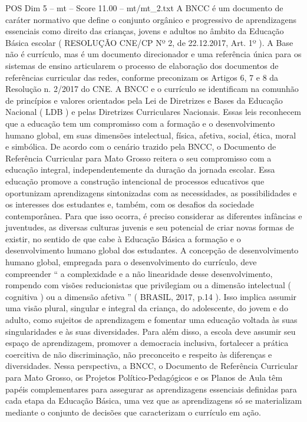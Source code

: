 \begin{textsample}{POS Dim 5 – mt – Score 11.00 – mt/mt\_2.txt}
A BNCC é um documento de caráter normativo que define o conjunto orgânico e progressivo de aprendizagens essenciais como direito das crianças, jovens e adultos no âmbito da Educação Básica escolar ( RESOLUÇÃO CNE/CP Nº 2, de 22.12.2017, Art. 1º ).
A Base não é currículo, mas é um documento direcionador e uma referência única para os sistemas de ensino articularem o processo de elaboração dos documentos de referências curricular das redes, conforme preconizam os Artigos 6, 7 e 8 da Resolução n. 2/2017 do CNE.
A BNCC e o currículo se identificam na comunhão de princípios e valores orientados pela Lei de Diretrizes e Bases da Educação Nacional ( LDB ) e pelas Diretrizes Curriculares Nacionais.
Essas leis reconhecem que a educação tem um compromisso com a formação e o desenvolvimento humano global, em suas dimensões intelectual, física, afetiva, social, ética, moral e simbólica.
De acordo com o cenário trazido pela BNCC, o Documento de Referência Curricular para Mato Grosso reitera o seu compromisso com a educação integral, independentemente da duração da jornada escolar.
Essa educação promove a construção intencional de processos educativos que oportunizam aprendizagens sintonizadas com as necessidades, as possibilidades e os interesses dos estudantes e, também, com os desafios da sociedade contemporânea.
Para que isso ocorra, é preciso considerar as diferentes infâncias e juventudes, as diversas culturas juvenis e seu potencial de criar novas formas de existir, no sentido de que cabe à Educação Básica a formação e o desenvolvimento humano global dos estudantes.
A concepção de desenvolvimento humano global, empregada para o desenvolvimento do currículo, deve compreender “ a complexidade e a não linearidade desse desenvolvimento, rompendo com visões reducionistas que privilegiam ou a dimensão intelectual ( cognitiva ) ou a dimensão afetiva ” ( BRASIL, 2017, p.14 ).
Isso implica assumir uma visão plural, singular e integral da criança, do adolescente, do jovem e do adulto, como sujeitos de aprendizagem e fomentar uma educação voltada às suas singularidades e às suas diversidades.
Para além disso, a escola deve assumir seu espaço de aprendizagem, promover a democracia inclusiva, fortalecer a prática coercitiva de não discriminação, não preconceito e respeito às diferenças e diversidades.
Nessa perspectiva, a BNCC, o Documento de Referência Curricular para Mato Grosso, os Projetos Político-Pedagógicos e os Planos de Aula têm papéis complementares para assegurar as aprendizagens essenciais definidas para cada etapa da Educação Básica, uma vez que as aprendizagens só se materializam mediante o conjunto de decisões que caracterizam o currículo em ação.

\end{textsample}
